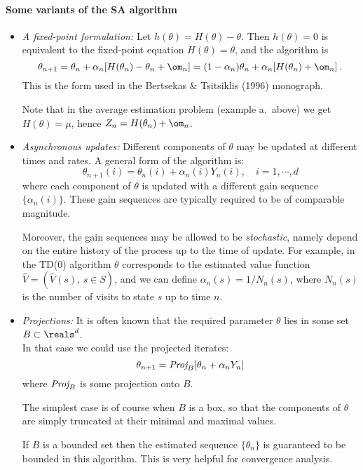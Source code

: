 \paragraph{Some variants of the SA algorithm}
\begin{itemize}
\item
{\em A fixed-point formulation:}
Let $h(\theta) = H(\theta) - \theta$. Then
$h(\theta) = 0$ is equivalent to the fixed-point equation
$H(\theta) = \theta$,  and the algorithm is
$$
\theta_{n+1} = \theta_n + \alpha_n [H(\theta_n) - \theta_n + \om_n] =
(1-\alpha_n) \theta_n + \alpha_n [H(\theta_n) + \om_n]\,.
$$
This is the form used in the Bertsekas \& Tsitsiklis (1996) monograph.

Note that in the average estimation problem (example a.~above) we get
$H(\theta)=\mu$, hence $Z_n=H(\theta_n) + \om_n$.

\item
{\em Asynchronous updates:}
Different components of $\theta$ may be updated at different times and rates.
A general form of the algorithm is:
$$
\theta_{n+1} (i) = \theta_n(i) + \alpha_n(i) Y_n(i), \quad i=1, \cdots, d
$$
where each component of $\theta$ is updated with a different gain sequence
$\{\alpha_n(i)\}$. These gain sequences are typically required to be
of comparable magnitude.

Moreover, the gain sequences may be allowed to be {\em stochastic},
namely depend on the entire history of the process up to the time of update.
For example, in the TD(0) algorithm $\theta$ corresponds to the estimated
value function
$\hat V=(\hat V(s),\,s\in S)$, and we can define $\alpha_n(s)=1/N_n(s)$,
where $N_n(s)$ is the number of visits to state $s$ up to time $n$.

\item
{\em Projections:}
It is often known that the required parameter $\theta$ lies in some set
$B\subset \reals^d$.\\
In that case we could use the projected iterates:
$$
\theta_{n+1} = \text{\it Proj}_B [\theta_n + \alpha_n Y_n]
$$
where $\text{\it Proj}_B$ is some projection onto $B$.

The simplest case is of course when $B$ is a box, so that the components
of $\theta$ are simply truncated at their minimal and maximal values.

If $B$ is a bounded set then the estimated sequence $\{\theta_n\}$ is guaranteed
to be bounded in this algorithm. This is very helpful for convergence analysis.

\end{itemize}


